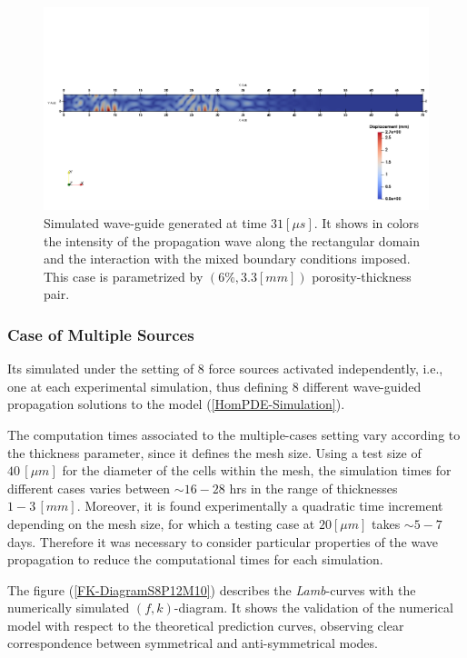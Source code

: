 \begin{figure}[!h]
	\centering
	\includegraphics[width=\textwidth]{images/ImgExt/SimP6TransIso33M780T310.png}
	\caption{Simulated wave-guide generated at time $31 [\mu s]$. It shows in colors the intensity of the propagation wave along the rectangular domain and the interaction with the mixed boundary conditions imposed. This case is parametrized by $(6\%, 3.3 [mm])$ porosity-thickness pair.}
	\label{Sim2D-TimeStep}
\end{figure}


\subsubsection{Case of Multiple Sources}
Its simulated under the setting of 8 force sources activated independently, i.e., one at each experimental simulation, thus defining 8 different wave-guided propagation solutions to the model (\ref{HomPDE-Simulation}).

\begin{rem}
The computation times associated to the multiple-cases setting vary according to the thickness parameter, since it defines the mesh size. Using a test size of $40 \, [\mu m]$ for the diameter of the cells within the mesh, the simulation times for different cases varies between $\sim 16-28$ hrs in the range of thicknesses $1-3 \, [mm]$. Moreover, it is found experimentally a quadratic time increment depending on the mesh size, for which a testing case at $20 [\mu m]$ takes $\sim 5-7$ days. 
Therefore it was necessary to consider particular properties of the wave propagation to reduce the computational times for each simulation.
\end{rem}

The figure (\ref{FK-DiagramS8P12M10}) describes the \textit{Lamb}-curves with the numerically simulated $(f,k)$-diagram. It shows the validation of the numerical model with respect to the theoretical prediction curves, observing clear correspondence between symmetrical and anti-symmetrical modes.

